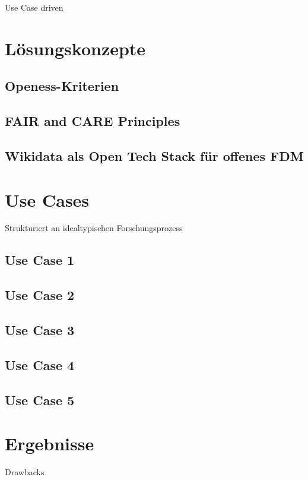\onehalfspacing

Use Case driven

\section{Lösungskonzepte}
\subsection{Openess-Kriterien}
\subsection{FAIR and CARE Principles}
\subsection{Wikidata als Open Tech Stack für offenes FDM}

\section{Use Cases}

Strukturiert an idealtypischen Forschungsprozess

\subsection{Use Case 1}

\subsection{Use Case 2}

\subsection{Use Case 3}

\subsection{Use Case 4}

\subsection{Use Case 5}

\section{Ergebnisse}

Drawbacks